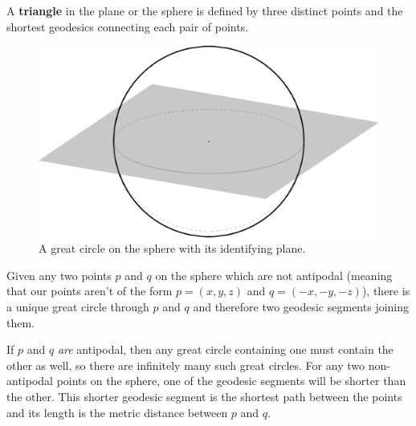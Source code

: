 \begin{definition}
	A \textbf{triangle} in the plane or the sphere is defined by three distinct points and the shortest geodesics connecting each pair of points.
\end{definition}






{
\ifsmallfigs
\else
\begin{figure}[htb]
	\centering
	\includegraphics[width=.5\textwidth]{figs/sph-1pl.pdf}
	\caption{A great circle on the sphere with its identifying plane.}
	\label{fig:sphereline}
\end{figure}
\fi
}



\begin{observation}
	Given any two points $p$ and $q$ on the sphere which are not antipodal (meaning that our points aren't of the form $p=(x,y,z)$ and $q=(-x,-y,-z)$), there is a unique great circle through $p$ and $q$ and therefore two geodesic segments joining them. 
\end{observation}
If $p$ and $q$ \textit{are} antipodal, then any great circle containing one must contain the other as well, so there are infinitely many such great circles. For any two non-antipodal points on the sphere, one of the geodesic segments will be shorter than the other.  {This shorter geodesic segment is the shortest path between the points and its length is the metric distance between $p$ and $q$}.

